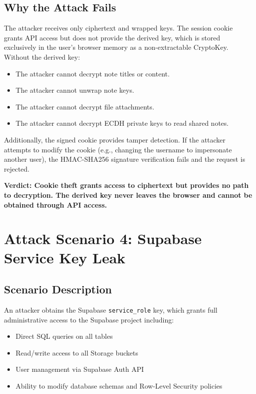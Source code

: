 \subsection{Why the Attack Fails}

The attacker receives only ciphertext and wrapped keys. The session cookie grants API access but does not provide the derived key, which is stored exclusively in the user's browser memory as a non-extractable CryptoKey. Without the derived key:

\begin{itemize}
    \item The attacker cannot decrypt note titles or content.
    \item The attacker cannot unwrap note keys.
    \item The attacker cannot decrypt file attachments.
    \item The attacker cannot decrypt ECDH private keys to read shared notes.
\end{itemize}

Additionally, the signed cookie provides tamper detection. If the attacker attempts to modify the cookie (e.g., changing the username to impersonate another user), the HMAC-SHA256 signature verification fails and the request is rejected.

\textbf{Verdict: Cookie theft grants access to ciphertext but provides no path to decryption. The derived key never leaves the browser and cannot be obtained through API access.}

\section{Attack Scenario 4: Supabase Service Key Leak}

\subsection{Scenario Description}

An attacker obtains the Supabase \texttt{service\_role} key, which grants full administrative access to the Supabase project including:
\begin{itemize}
    \item Direct SQL queries on all tables
    \item Read/write access to all Storage buckets
    \item User management via Supabase Auth API
    \item Ability to modify database schemas and Row-Level Security policies
\end{itemize}

